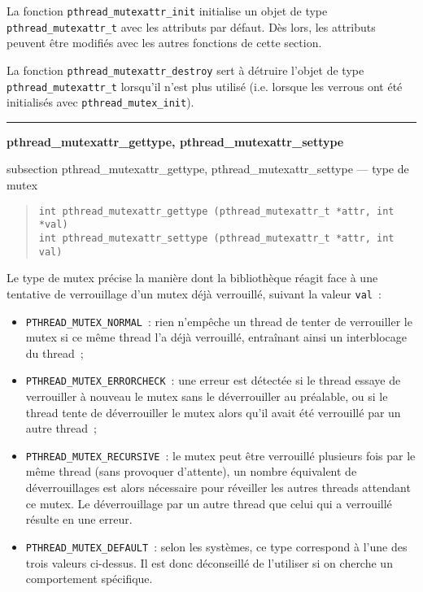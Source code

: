 \documentclass [twoside] {report}
\newcommand {\primitive} [1]
    {
	\phantomsection
	{\large \textbf {#1}}
	\addcontentsline {toc} {subsection} {#1}
    }
\newcommand {\separation}
    {
	\vspace {5mm}
	\nopagebreak
	\hrule
    }
\begin{document}
La fonction \verb|pthread_mutexattr_init| initialise un objet de type
\verb|pthread_mutexattr_t| avec les attributs par défaut. Dès lors, les
attributs peuvent être modifiés avec les autres fonctions de cette
section.

La fonction \verb|pthread_mutexattr_destroy| sert à détruire l'objet de type
\verb|pthread_mutexattr_t| lorsqu'il n'est plus utilisé (i.e.  lorsque les
verrous ont été initialisés avec \verb|pthread_mutex_init|).


\separation
\primitive {pthread\_mutexattr\_gettype, pthread\_mutexattr\_settype} --- type de mutex

\begin {quote}
\begin {verbatim}
int pthread_mutexattr_gettype (pthread_mutexattr_t *attr, int *val)
int pthread_mutexattr_settype (pthread_mutexattr_t *attr, int val)
\end{verbatim}
\end {quote}

Le type de mutex précise la manière dont la bibliothèque réagit
face à une tentative de verrouillage d'un mutex déjà verrouillé,
suivant la valeur \texttt {val}~:

\begin {itemize}
    \item \verb|PTHREAD_MUTEX_NORMAL|~: rien n'empêche un thread
	de tenter de verrouiller le mutex si ce même thread l'a déjà
	verrouillé, entraînant ainsi un interblocage du thread~;
    \item \verb|PTHREAD_MUTEX_ERRORCHECK|~: une erreur est détectée
	si le thread essaye de verrouiller à nouveau le mutex sans le
	déverrouiller au préalable, ou si le thread tente de
	déverrouiller le mutex alors qu'il avait été verrouillé par un
	autre thread~;
    \item \verb|PTHREAD_MUTEX_RECURSIVE|~: le mutex peut être verrouillé
	plusieurs fois par le même thread (sans provoquer d'attente),
	un nombre équivalent de déverrouillages est alors nécessaire
	pour réveiller les autres threads attendant ce mutex. Le
	déverrouillage par un autre thread que celui qui a verrouillé
	résulte en une erreur.
    \item \verb|PTHREAD_MUTEX_DEFAULT|~: selon les systèmes, ce type
	correspond à l'une des trois valeurs ci-dessus. Il est donc
	déconseillé de l'utiliser si on cherche un comportement
	spécifique.
\end {itemize}
\end{document}
